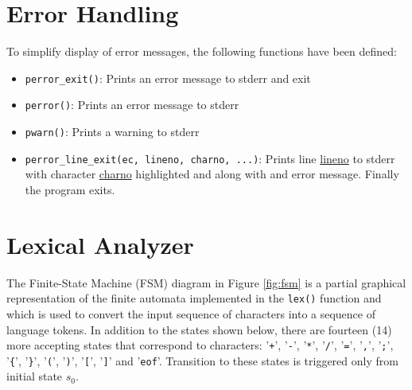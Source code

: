 \documentclass{article}
\def\code#1{\texttt{#1}} %
\begin{document}

\section{Error Handling}

To simplify display of error messages, the following functions have been defined:
\begin{itemize}
 \item \code{perror\_exit()}: Prints an error message to stderr and exit
 \item \code{perror()}: Prints an error message to stderr
 \item \code{pwarn()}: Prints a warning to stderr
 \item \code{perror\_line\_exit(ec, lineno, charno, ...)}: Prints line \underline{lineno}
       to stderr with character \underline{charno} highlighted and along with and error message.
       Finally the program exits.
\end{itemize}



\pagebreak



\section{Lexical Analyzer}

The Finite-State Machine (FSM) diagram in Figure \ref{fig:fsm} is a partial graphical representation of the
finite automata implemented in the \code{lex()} function and which is used to convert the input
sequence of characters into a sequence of language tokens. In addition to the states shown below,
there are fourteen (14) more accepting states that correspond to characters: '\code{+}', '\code{-}', '\code{*}', 
'\code{/}', '\code{=}', '\code{,}', '\code{;}', '\code{\{}', '\code{\}}', '\code{(}', '\code{)}', 
'\code{[}', '\code{]}' and '\code{eof}'. Transition to these states is triggered only from initial state $s_0$.
\vspace{1cm}
\end{document}

